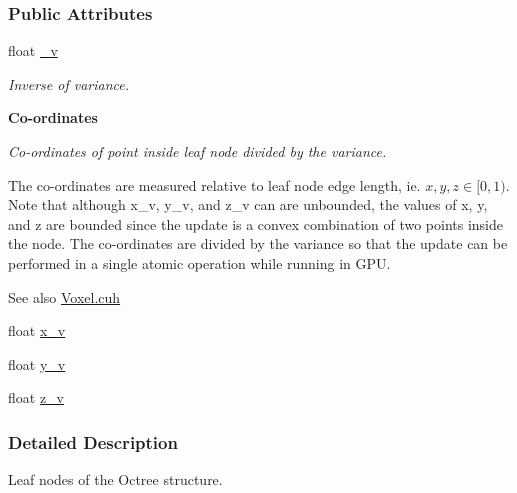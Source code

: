 \subsubsection*{Public Attributes}
\begin{DoxyCompactItemize}
\item 
float \hyperlink{classleaf_a4fc347dbd4f5911bbb477910588ed512}{\+\_\+v}
\begin{DoxyCompactList}\small\item\em Inverse of variance. \end{DoxyCompactList}\end{DoxyCompactItemize}
\begin{Indent}{\bf Co-\/ordinates}\par
{\em Co-\/ordinates of point inside leaf node divided by the variance.

The co-\/ordinates are measured relative to leaf node edge length, ie. $x, y, z \in [0,1)$. Note that although x\+\_\+v, y\+\_\+v, and z\+\_\+v can are unbounded, the values of x, y, and z are bounded since the update is a convex combination of two points inside the node. The co-\/ordinates are divided by the variance so that the update can be performed in a single atomic operation while running in G\+PU. \begin{DoxySeeAlso}{See also}
\hyperlink{Voxel_8cuh}{Voxel.\+cuh} 
\end{DoxySeeAlso}
}\begin{DoxyCompactItemize}
\item 
float \hyperlink{classleaf_ac34a93ca5739928d7389b12e735252d4}{x\+\_\+v}
\item 
float \hyperlink{classleaf_a06a94d40da44b846913db4d8900b2626}{y\+\_\+v}
\item 
float \hyperlink{classleaf_a5f51fe13eb6e53bd9549469011e7a10e}{z\+\_\+v}
\end{DoxyCompactItemize}
\end{Indent}


\subsubsection{Detailed Description}
Leaf nodes of the Octree structure. 

